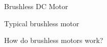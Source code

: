 \documentclass[compress]{beamer}
\begin{document}
{
\begin{frame}{Brushless DC Motor}

%
%

\end{frame}
}

{
\begin{frame}{Typical brushless motor}

\end{frame}
}


{
\begin{frame}{How do brushless motors work?}


\end{frame}
}
\end{document}
